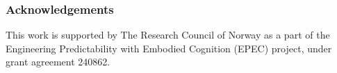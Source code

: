 \documentclass[sigchi, authorversion=true]{acmart}
\begin{document}
\subsubsection*{Acknowledgements}
This work is supported by The Research Council of Norway as
a part of the Engineering Predictability with Embodied Cognition
(EPEC) project, under grant agreement 240862.



\end{document}
